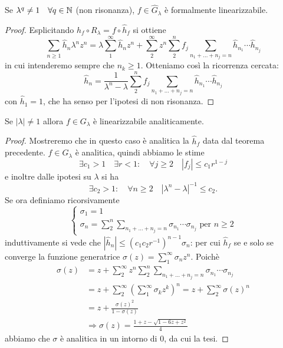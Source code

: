 \begin{teo} Se $\lambda^q\neq 1 \quad \forall q\in\mathbb{N}$ (non risonanza), $f\in \hat G_\lambda$ è formalmente linearizzabile.\end{teo}
\begin{proof} Esplicitando $\hat h_f\circ R_\lambda=f\circ\hat h_f$ si ottiene
 \[\sum_{n\geq 1} \hat h_n \lambda^nz^n=\lambda\sum_1^\infty\hat h_nz^n+\sum_2^\infty z^n\sum_2^n f_j \sum_{n_1+\dots+n_j=n}\hat h_{n_1}\cdots\hat h_{n_j} \]
 in cui intenderemo sempre che $n_k\geq 1$. Otteniamo così la ricorrenza cercata:
 \[\hat h_n=\frac{1}{\lambda^n-\lambda}\sum_2^n f_j\sum_{n_1+\dots+n_j=n}\hat h_{n_1}\cdots\hat h_{n_j}\]
 con $\hat h_1=1$, che ha senso per l'ipotesi di non risonanza.
\end{proof}

\begin{teo} Se $|\lambda|\neq 1$ allora $f\in G_\lambda$ è linearizzabile analiticamente.\end{teo}
\begin{proof}
Mostreremo che in questo caso è analitica la $\hat h_f$ data dal teorema precedente.
 $f\in G_\lambda$ è analitica, quindi abbiamo le stime
 \[\exists c_1>1 \quad \exists r<1 : \quad \forall j\geq 2 \quad |f_j|\leq c_1 r^{1-j}\]
 e inoltre dalle ipotesi su $\lambda$ si ha
 \[\exists c_2>1: \quad \forall n\geq 2 \quad |\lambda^n-\lambda|^{-1}\leq c_2.\]
 Se ora definiamo ricorsivamente
 \[\begin{cases}
       \sigma_1=1\\
       \sigma_n=\sum_2^n \sum_{n_1+\dots+n_j=n}\sigma_{n_1}\cdots\sigma_{n_j} \text{ per } n\ge 2
   \end{cases}\]
 induttivamente si vede che $|\hat h_n|\leq (c_1 c_2 r^{-1})^{n-1}\sigma_n$: per cui $\hat h_f$ se e solo se converge la funzione generatrice $\sigma(z)=\sum_1^\infty \sigma_n z^n$. Poichè
 \[\begin{split}
 \sigma(z)&=z+\sum_2^\infty z^n \sum_2^n \sum_{n_1+\dots+n_j=n}\sigma_{n_1}\cdots\sigma_{n_j}\\
	  &=z+\sum_2^\infty \left(\sum_1^\infty \sigma_k z^k\right)^n=z+\sum_2^\infty \sigma(z)^n\\
	  &=z+\frac{\sigma(z)^2}{1-\sigma(z)}\\
	  &\Longrightarrow \sigma(z)=\frac{1+z-\sqrt{1-6z+z^2}}{4}
 \end{split}\]
 abbiamo che $\sigma$ è analitica in un intorno di $0$, da cui la tesi. 
\end{proof}

